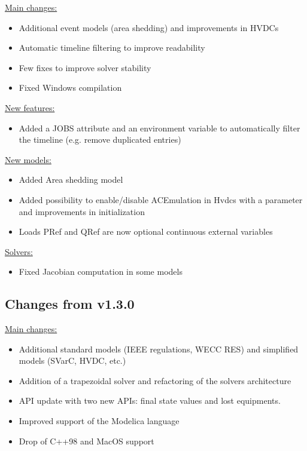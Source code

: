 \documentclass[a4paper, 12pt]{report}
\begin{document}
\underline{Main changes:}
\begin{itemize}
\item Additional event models (area shedding) and improvements in HVDCs
\item Automatic timeline filtering to improve readability
\item Few fixes to improve solver stability
\item Fixed Windows compilation
\end{itemize}

\underline{New features:}
\begin{itemize}
\item Added a JOBS attribute and an environment variable to automatically filter the timeline (e.g. remove duplicated entries)
\end{itemize}

\underline{New models:}
\begin{itemize}
\item Added Area shedding model
\item Added possibility to enable/disable ACEmulation in Hvdcs with a parameter and improvements in initialization
\item Loads PRef and QRef are now optional continuous external variables
\end{itemize}

\underline{Solvers:}
\begin{itemize}
\item Fixed Jacobian computation in some models
\end{itemize}

\subsection{Changes from v1.3.0}

\underline{Main changes:}
\begin{itemize}
\item Additional standard models (IEEE regulations, WECC RES) and simplified models (SVarC, HVDC, etc.)
\item Addition of a trapezoidal solver and refactoring of the solvers architecture
\item API update with two new APIs: final state values and lost equipments.
\item Improved support of the Modelica language
\item Drop of C++98 and MacOS support
\end{itemize}
\end{document}
